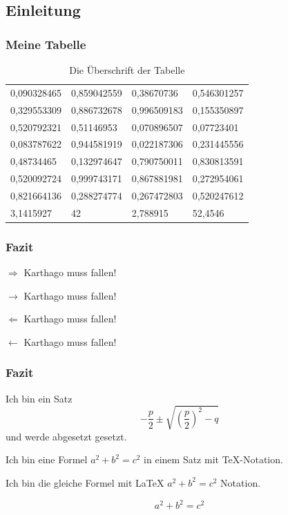 \documentclass[ngerman]{beamer}
\begin{document}
\subsection{Einleitung}

\begin{frame}
	\frametitle{Meine Tabelle}
	
\begin{table}
	\caption{Die Überschrift der Tabelle}
\begin{tabular}{llll} \toprule[1.5pt]
	0,090328465	&	0,859042559	&	0,38670736	&	0,546301257	\\
	0,329553309	&	0,886732678	&	0,996509183	&	0,155350897	\\
	0,520792321	&	0,51146953	&	0,070896507	&	0,07723401	\\
	0,083787622	&	0,944581919	&	0,022187306	&	0,231445556	\\
	0,48734465	&	0,132974647	&	0,790750011	&	0,830813591	\\
	0,520092724	&	0,999743171	&	0,867881981	&	0,272954061	\\
	0,821664136	&	0,288274774	&	0,267472803	&	0,520247612	\\
	3,1415927 & 42 & 2,788915 & 52,4546 \\ \bottomrule[1.5pt]
\end{tabular}
\end{table}
	
\end{frame}


\begin{frame}
	\frametitle{Fazit}
	
$\Rightarrow$ Karthago muss fallen!
	
$\rightarrow$ Karthago muss fallen!	
	
$\Leftarrow$ Karthago muss fallen!

$\leftarrow$ Karthago muss fallen!	
	
	
\end{frame}

\begin{frame}
	\frametitle{Fazit}
	
	
Ich bin ein Satz	
\begin{equation}
-\frac{p}{2} \pm \sqrt{   \left(\frac{p}{2}\right)^2  - q   }
\end{equation} und werde abgesetzt gesetzt.

Ich bin eine Formel $a^2+b^2=c^2$ in einem Satz mit TeX-Notation.

Ich bin die gleiche Formel mit LaTeX \( a^2 + b^2 = c^2 \) Notation.

\[  a^2 + b^2 = c^2 \]


	
\end{frame}


	
\end{document}
